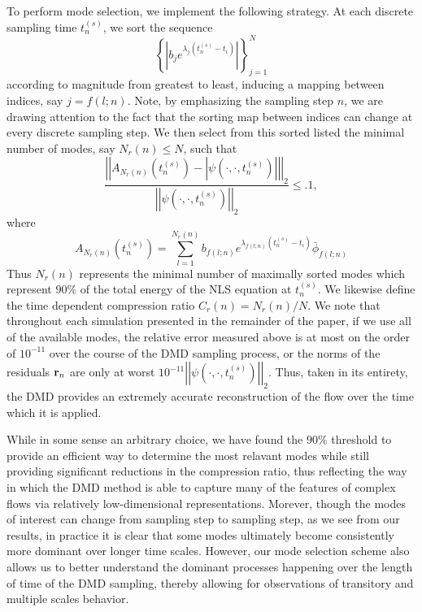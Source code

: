 \documentclass[a4paper,11pt]{article}
\newcommand{\gnorm}[1]{\left|\left| #1\right|\right|}
\begin{document}
To perform mode selection, we implement the following strategy.  At each discrete sampling time $t^{(s)}_{n}$, we sort the sequence 
\[
\left\{ \left|  b_{j}e^{\lambda_{j}(t_{n}^{(s)}-t_{i})} \right| \right\}_{j=1}^{N}
\]
according to magnitude from greatest to least, inducing a mapping between indices, say $j=f(l;n)$.  Note, by emphasizing the sampling step $n$, we are drawing attention to the fact that the sorting map between indices can change at every discrete sampling step.  We then select from this sorted listed the minimal number of modes, say $N_{r}(n)\leq N$, such that 
\[
\frac{\gnorm{A_{N_{r}(n)}\left(t^{(s)}_{n}\right) - \left|\psi(\cdot,\cdot,t^{(s)}_{n})\right|}_{2}}{\gnorm{\psi(\cdot,\cdot,t^{(s)}_{n})}_{2}} \leq .1,
\]
where
\[
A_{N_{r}(n)}\left(t^{(s)}_{n}\right) = \sum_{l=1}^{N_{r}(n)} b_{f(l;n)}e^{\lambda_{f(l;n)}(t^{(s)}_{n}-t_{i})} \bar{\phi}_{f(l;n)}
\]
Thus $N_{r}(n)$ represents the minimal number of maximally sorted modes which represent $90\%$ of the total energy of the NLS equation at $t^{(s)}_{n}$.  We likewise define the time dependent compression ratio $C_{r}(n)=N_{r}(n)/N$.  We note that throughout each simulation presented in the remainder of the paper, if we use all of the available modes, the relative error measured above is at most on the order of $10^{-11}$ over the course of the DMD sampling process, or the norms of the residuals ${\bf r}_{n}$ are only at worst $10^{-11}\gnorm{\psi(\cdot,\cdot,t^{(s)}_{n})}_{2}$.  Thus, taken in its entirety, the DMD provides an extremely accurate reconstruction of the flow over the time which it is applied.  

While in some sense an arbitrary choice, we have found the $90\%$ threshold to provide an efficient way to determine the most relavant modes while still providing significant reductions in the compression ratio, thus reflecting the way in which the DMD method is able to capture many of the features of complex flows via relatively low-dimensional representations.  
Morever, though the modes of interest can change from sampling step to sampling step, as we see from our results, in practice it is clear that some modes ultimately become consistently more dominant over longer time scales.  However, our mode selection scheme also allows us to better understand the dominant processes happening over the length of time of the DMD sampling, thereby allowing for observations of transitory and multiple scales behavior.  
\end{document}
